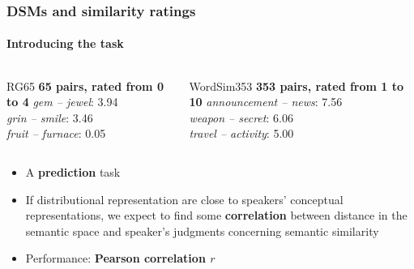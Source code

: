 \documentclass[t]{beamer} %
\begin{document}
\begin{frame}
  \frametitle{DSMs and similarity ratings}
  \framesubtitle{Introducing the task}

  \ungap[1]
  \begin{columns}
    \begin{column}{0.5\textwidth}
      \begin{exampleblock}{RG65}
        \textbf{65 pairs, rated from 0 to 4}
        \textit{gem -- jewel}: 3.94 \\
        \textit{grin -- smile}:  3.46 \\
        \textit{fruit -- furnace}: 0.05 \\
      \end{exampleblock}
    \end{column}
    \begin{column}{0.5\textwidth}
      
      
      \begin{exampleblock}  {WordSim353}
        \textbf{353 pairs, rated from 1 to 10}
        \textit{announcement -- news}: 7.56 \\
        \textit{weapon -- secret}:  6.06 \\
        \textit{travel -- activity}: 5.00 \\
      \end{exampleblock}
    \end{column}
  \end{columns}
  \begin{itemize}
  \item A \textbf{prediction} task
  \item If distributional representation are close to  speakers' conceptual representations, we expect to find some \textbf{correlation} between distance in the semantic space and speaker's judgments concerning semantic similarity
  \item Performance: \textbf{Pearson correlation $r$}
  \end{itemize}

\end{frame}
\end{document}
